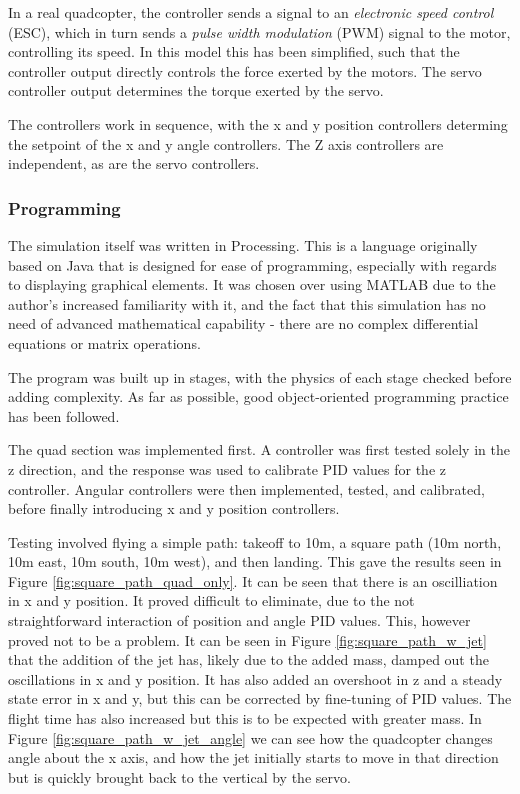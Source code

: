 \documentclass[10pt]{article}
\begin{document}
In a real quadcopter, the controller sends a signal to an \emph{electronic speed control} (ESC), which in turn sends a \emph{pulse width modulation} (PWM) signal to the motor, controlling its speed. In this model this has been simplified, such that the controller output directly controls the force exerted by the motors. The servo controller output determines the torque exerted by the servo.

The controllers work in sequence, with the x and y position controllers determing the setpoint of the x and y angle controllers. The Z axis controllers are independent, as are the servo controllers.

\subsubsection{Programming}
The simulation itself was written in Processing. This is a language originally based on Java that is designed for ease of programming, especially with regards to displaying graphical elements. It was chosen over using MATLAB due to the author's increased familiarity with it, and the fact that this simulation has no need of advanced mathematical capability - there are no complex differential equations or matrix operations.

The program was built up in stages, with the physics of each stage checked before adding complexity. As far as possible, good object-oriented programming practice has been followed.

The quad section was implemented first. A controller was first tested solely in the z direction, and the response was used to calibrate PID values for the z controller. Angular controllers were then implemented, tested, and calibrated, before finally introducing x and y position controllers.

Testing involved flying a simple path: takeoff to 10m, a square path (10m north, 10m east, 10m south, 10m west), and then landing. This gave the results seen in Figure \ref{fig:square_path_quad_only}. It can be seen that there is an oscilliation in x and y position. It proved difficult to eliminate, due to the not straightforward interaction of position and angle PID values. This, however proved not to be a problem. It can be seen in Figure \ref{fig:square_path_w_jet} that the addition of the jet has, likely due to the added mass, damped out the oscillations in x and y position. It has also added an overshoot in z and a steady state error in x and y, but this can be corrected by fine-tuning of PID values. The flight time has also increased but this is to be expected with greater mass. In Figure \ref{fig:square_path_w_jet_angle} we can see how the quadcopter changes angle about the x axis, and how the jet initially starts to move in that direction but is quickly brought back to the vertical by the servo.
\end{document}
